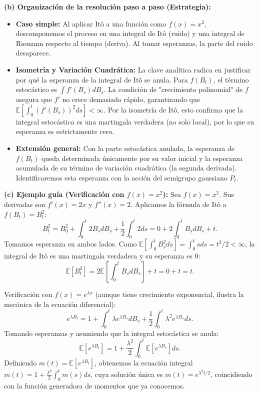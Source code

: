 \documentclass[11pt, letterpaper]{article}
\begin{document}
\vspace{5mm}

\begin{solucion}
    \textbf{(b) Organización de la resolución paso a paso (Estrategia):}
    \begin{itemize}
        \item[(i)] \textbf{Caso simple:} Al aplicar Itô a una función como $f(x)=x^2$, descomponemos el proceso en una integral de Itô (ruido) y una integral de Riemann respecto al tiempo (deriva). Al tomar esperanzas, la parte del ruido desaparece.
        \item[(ii)] \textbf{Isometría y Variación Cuadrática:} La clave analítica radica en justificar por qué la esperanza de la integral de Itô se anula. Para $f(B_t)$, el término estocástico es $\int f'(B_s)dB_s$. La condición de "crecimiento polinomial" de $f$ asegura que $f'$ no crece demasiado rápido, garantizando que $\mathbb{E}[\int_0^t (f'(B_s))^2 ds] < \infty$. Por la isometría de Itô, esto confirma que la integral estocástica es una martingala verdadera (no solo local), por lo que su esperanza es estrictamente cero.
        \item[(iii)] \textbf{Extensión general:} Con la parte estocástica anulada, la esperanza de $f(B_t)$ queda determinada únicamente por su valor inicial y la esperanza acumulada de su término de variación cuadrática (la segunda derivada). Identificaremos esta esperanza con la acción del semigrupo gaussiano $P_t$.
    \end{itemize}

    \vspace{3mm}
    \textbf{(c) Ejemplo guía (Verificación con $f(x) = x^2$):}
    Sea $f(x) = x^2$. Sus derivadas son $f'(x) = 2x$ y $f''(x) = 2$.
    Aplicamos la fórmula de Itô a $f(B_t) = B_t^2$:
    \[ B_t^2 = B_0^2 + \int_0^t 2B_s dB_s + \frac{1}{2} \int_0^t 2 ds = 0 + 2\int_0^t B_s dB_s + t. \]
    Tomamos esperanza en ambos lados. Como $\mathbb{E}[\int_0^t B_s^2 ds] = \int_0^t s ds = t^2/2 < \infty$, la integral de Itô es una martingala verdadera y su esperanza es 0:
    \[ \mathbb{E}[B_t^2] = 2\mathbb{E}\left[ \int_0^t B_s dB_s \right] + t = 0 + t = t. \]
    
    Verificación con $f(x) = e^{\lambda x}$ (aunque tiene crecimiento exponencial, ilustra la mecánica de la ecuación diferencial):
    \[ e^{\lambda B_t} = 1 + \int_0^t \lambda e^{\lambda B_s} dB_s + \frac{1}{2} \int_0^t \lambda^2 e^{\lambda B_s} ds. \]
    Tomando esperanzas y asumiendo que la integral estocástica se anula:
    \[ \mathbb{E}[e^{\lambda B_t}] = 1 + \frac{\lambda^2}{2} \int_0^t \mathbb{E}[e^{\lambda B_s}] ds. \]
    Definiendo $m(t) = \mathbb{E}[e^{\lambda B_t}]$, obtenemos la ecuación integral $m(t) = 1 + \frac{\lambda^2}{2} \int_0^t m(s) ds$, cuya solución única es $m(t) = e^{\lambda^2 t / 2}$, coincidiendo con la función generadora de momentos que ya conocemos.


\end{solucion}
\end{document}
